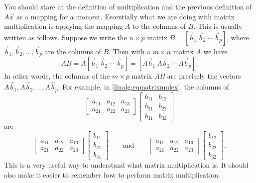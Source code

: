 You should stare at the definition of multiplication and
the previous definition of $A\vec{x}$ as a mapping
for a moment.
Essentially what we are doing with matrix multiplication is applying
the mapping $A$ to the columns of $B$.  This is usually written as follows.
Suppose we write the $n \times p$ matrix
$B = [ \vec{b}_1 ~ \vec{b}_2 ~ \cdots ~ \vec{b}_p ]$, where
$\vec{b}_1, \vec{b}_2, \ldots, \vec{b}_p$ are the columns of $B$.  Then
with a $m \times n$ matrix $A$ we have
\begin{equation*}
AB = 
A [ \vec{b}_1 ~ \vec{b}_2 ~ \cdots ~ \vec{b}_p ]
=
[ A\vec{b}_1 ~ A\vec{b}_2 ~ \cdots ~ A\vec{b}_p ] .
\end{equation*}
In other words, the columns of the $m \times p$ matrix $AB$
are precisely the
vectors $A\vec{b}_1, A\vec{b}_2, \ldots, A\vec{b}_p$.
For example, in \eqref{linalg:eqmatrixmulex},
the columns of 
\begin{equation*}
\begin{bmatrix}
a_{11} & a_{12} & a_{13} \\
a_{21} & a_{22} & a_{23}
\end{bmatrix}
\begin{bmatrix}
b_{11} & b_{12} \\
b_{21} & b_{22} \\
b_{31} & b_{32}
\end{bmatrix}
\end{equation*}
are
\begin{equation*}
\begin{bmatrix}
a_{11} & a_{12} & a_{13} \\
a_{21} & a_{22} & a_{23}
\end{bmatrix}
\begin{bmatrix}
b_{11} \\
b_{21} \\
b_{31}
\end{bmatrix}
\qquad
\text{and}
\qquad
\begin{bmatrix}
a_{11} & a_{12} & a_{13} \\
a_{21} & a_{22} & a_{23}
\end{bmatrix}
\begin{bmatrix}
b_{12} \\
b_{22} \\
b_{32}
\end{bmatrix} .
\end{equation*}
This is a very useful way to understand what matrix multiplication is.
It should also make it easier to remember how to perform matrix multiplication.


